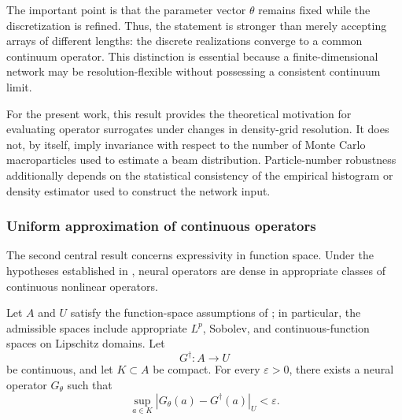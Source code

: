 \documentclass[11pt,a4paper]{article}
\begin{document}
\begin{sloppypar}
The important point is that the parameter vector $\theta$ remains fixed while the discretization is refined. Thus, the statement is stronger than merely accepting arrays of different lengths: the discrete realizations converge to a common continuum operator. This distinction is essential because a finite-dimensional network may be resolution-flexible without possessing a consistent continuum limit.

For the present work, this result provides the theoretical motivation for evaluating operator surrogates under changes in density-grid resolution. It does not, by itself, imply invariance with respect to the number of Monte Carlo macroparticles used to estimate a beam distribution. Particle-number robustness additionally depends on the statistical consistency of the empirical histogram or density estimator used to construct the network input.

\subsubsection{Uniform approximation of continuous operators}

The second central result concerns expressivity in function space. Under the hypotheses established in \cite{kovachki_neural_2023}, neural operators are dense in appropriate classes of continuous nonlinear operators.

\begin{theorem}
Let $A$ and $U$ satisfy the function-space assumptions of \cite{kovachki_neural_2023}; in particular, the admissible spaces include appropriate $L^p$, Sobolev, and continuous-function spaces on Lipschitz domains. Let
\begin{equation}
G^\dagger : A \to U
\end{equation}
be continuous, and let $K\subset A$ be compact. For every $\varepsilon>0$, there exists a neural operator $G_\theta$ such that
\begin{equation}
\sup_{a\in K}
\left|
G_\theta(a)
-
G^\dagger(a)
\right|_{U}
<
\varepsilon.
\label{eq:theorem-universal-operator}
\end{equation}
\end{theorem}


\end{sloppypar}
\end{document}
